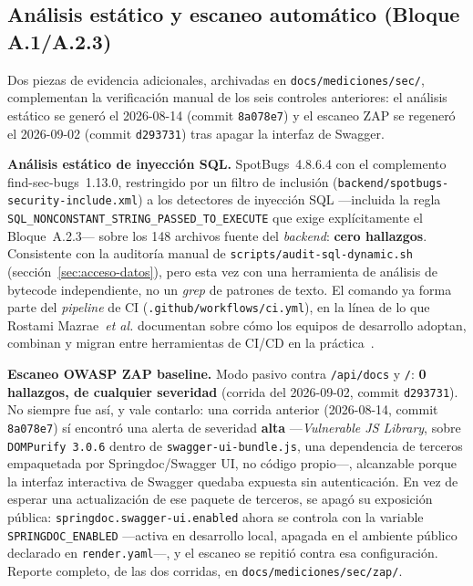 \documentclass[11pt,a4paper]{article}
\newcommand{\ruta}[1]{\texttt{\footnotesize #1}}
\begin{document}
\subsection{Análisis estático y escaneo automático (Bloque A.1/A.2.3)}
\label{sec:zap-spotbugs}

Dos piezas de evidencia adicionales, archivadas en
\ruta{docs/mediciones/sec/}, complementan la verificación manual de los
seis controles anteriores: el análisis estático se generó el 2026-08-14
(commit \texttt{8a078e7}) y el escaneo ZAP se regeneró el 2026-09-02
(commit \texttt{d293731}) tras apagar la interfaz de Swagger.

\textbf{Análisis estático de inyección SQL.} SpotBugs~4.8.6.4 con el
complemento find-sec-bugs~1.13.0, restringido por un filtro de
inclusión (\ruta{backend/spotbugs-security-include.xml}) a los
detectores de inyección SQL —incluida la regla
\texttt{SQL\_NONCONSTANT\_STRING\_PASSED\_TO\_EXECUTE} que exige
explícitamente el Bloque~A.2.3— sobre los 148 archivos fuente del
\emph{backend}: \textbf{cero hallazgos}. Consistente con la auditoría
manual de \ruta{scripts/audit-sql-dynamic.sh}
(sección~\ref{sec:acceso-datos}), pero esta vez con una herramienta de
análisis de bytecode independiente, no un \emph{grep} de patrones de
texto. El comando ya forma parte del \emph{pipeline} de CI
(\ruta{.github/workflows/ci.yml}), en la línea de lo que Rostami
Mazrae~\emph{et al.} documentan sobre cómo los equipos de desarrollo
adoptan, combinan y migran entre herramientas de CI/CD en la
práctica~\cite{rostamimazrae2023cicd}.

\textbf{Escaneo OWASP ZAP baseline.} Modo pasivo contra
\texttt{/api/docs} y \texttt{/}: \textbf{0 hallazgos, de cualquier
severidad} (corrida del 2026-09-02, commit \texttt{d293731}). No siempre
fue así, y vale contarlo: una corrida anterior (2026-08-14, commit
\texttt{8a078e7}) sí encontró una alerta de severidad \textbf{alta}
—\emph{Vulnerable JS Library}, sobre \texttt{DOMPurify 3.0.6} dentro de
\texttt{swagger-ui-bundle.js}, una dependencia de terceros empaquetada
por Springdoc/Swagger UI, no código propio—, alcanzable porque la
interfaz interactiva de Swagger quedaba expuesta sin autenticación. En
vez de esperar una actualización de ese paquete de terceros, se apagó
su exposición pública: \texttt{springdoc.swagger-ui.enabled} ahora se
controla con la variable \texttt{SPRINGDOC\_ENABLED} —activa en
desarrollo local, apagada en el ambiente público declarado en
\texttt{render.yaml}—, y el escaneo se repitió contra esa configuración.
Reporte completo, de las dos corridas, en
\ruta{docs/mediciones/sec/zap/}.
\end{document}
